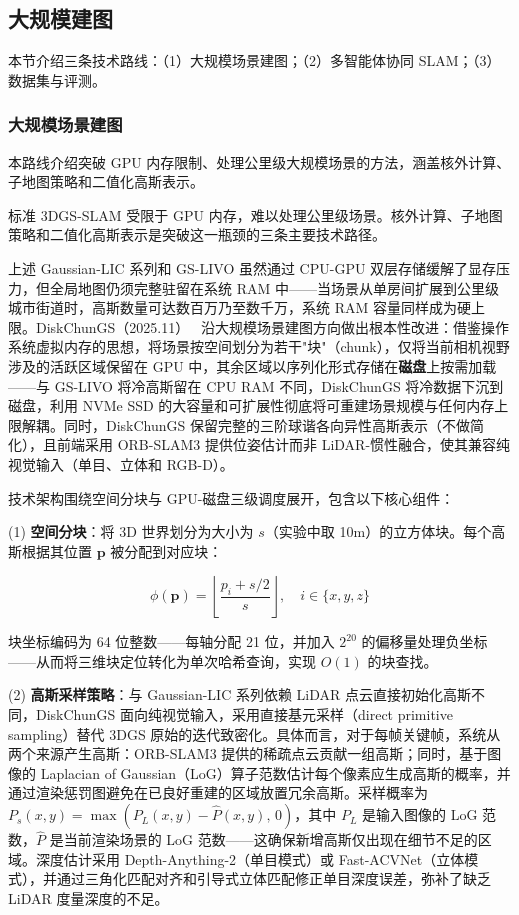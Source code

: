 \subsection{大规模建图}
\label{ss:15_8a}

本节介绍三条技术路线：（1）大规模场景建图；（2）多智能体协同 SLAM；（3）数据集与评测。

\subsubsection{大规模场景建图}

本路线介绍突破 GPU 内存限制、处理公里级大规模场景的方法，涵盖核外计算、子地图策略和二值化高斯表示。

标准 3DGS-SLAM 受限于 GPU 内存，难以处理公里级场景。核外计算、子地图策略和二值化高斯表示是突破这一瓶颈的三条主要技术路径。

上述 Gaussian-LIC 系列和 GS-LIVO 虽然通过 CPU-GPU 双层存储缓解了显存压力，但全局地图仍须完整驻留在系统 RAM 中——当场景从单房间扩展到公里级城市街道时，高斯数量可达数百万乃至数千万，系统 RAM 容量同样成为硬上限。DiskChunGS（2025.11）~\cite{2511_23030} 沿大规模场景建图方向做出根本性改进：借鉴操作系统虚拟内存的思想，将场景按空间划分为若干"块"（chunk），仅将当前相机视野涉及的活跃区域保留在 GPU 中，其余区域以序列化形式存储在\textbf{磁盘}上按需加载——与 GS-LIVO 将冷高斯留在 CPU RAM 不同，DiskChunGS 将冷数据下沉到磁盘，利用 NVMe SSD 的大容量和可扩展性彻底将可重建场景规模与任何内存上限解耦。同时，DiskChunGS 保留完整的三阶球谐各向异性高斯表示（不做简化），且前端采用 ORB-SLAM3 提供位姿估计而非 LiDAR-惯性融合，使其兼容纯视觉输入（单目、立体和 RGB-D）。

技术架构围绕空间分块与 GPU-磁盘三级调度展开，包含以下核心组件：

(1) \textbf{空间分块}：将 3D 世界划分为大小为 $s$（实验中取 10m）的立方体块。每个高斯根据其位置 $\mathbf{p}$ 被分配到对应块：

\[
\phi(\mathbf{p}) = \left\lfloor \frac{p_i + s/2}{s} \right\rfloor, \quad i \in \{x,y,z\}
\]

块坐标编码为 64 位整数——每轴分配 21 位，并加入 $2^{20}$ 的偏移量处理负坐标——从而将三维块定位转化为单次哈希查询，实现 $O(1)$ 的块查找。

(2) \textbf{高斯采样策略}：与 Gaussian-LIC 系列依赖 LiDAR 点云直接初始化高斯不同，DiskChunGS 面向纯视觉输入，采用直接基元采样（direct primitive sampling）替代 3DGS 原始的迭代致密化。具体而言，对于每帧关键帧，系统从两个来源产生高斯：ORB-SLAM3 提供的稀疏点云贡献一组高斯；同时，基于图像的 Laplacian of Gaussian（LoG）算子范数估计每个像素应生成高斯的概率，并通过渲染惩罚图避免在已良好重建的区域放置冗余高斯。采样概率为 $P_s(x,y) = \max(P_L(x,y) - \hat{P}(x,y),\, 0)$，其中 $P_L$ 是输入图像的 LoG 范数，$\hat{P}$ 是当前渲染场景的 LoG 范数——这确保新增高斯仅出现在细节不足的区域。深度估计采用 Depth-Anything-2（单目模式）或 Fast-ACVNet（立体模式），并通过三角化匹配对齐和引导式立体匹配修正单目深度误差，弥补了缺乏 LiDAR 度量深度的不足。

